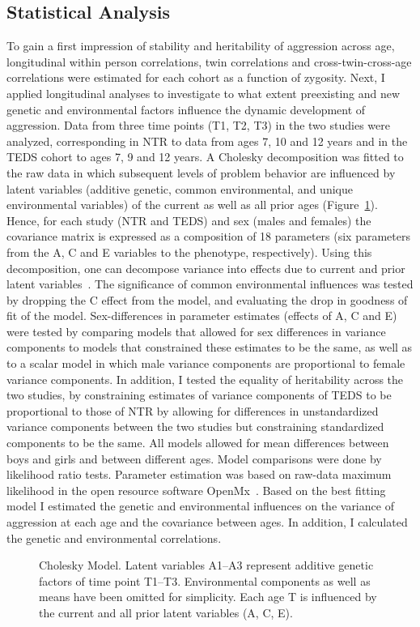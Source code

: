 \subsection{Statistical Analysis}
To gain a first impression of stability and heritability of aggression across age, longitudinal within person correlations, twin correlations and cross-twin-cross-age correlations were estimated for each cohort as a function of zygosity.
Next, I applied longitudinal analyses to investigate to what extent preexisting and new genetic and environmental factors influence the dynamic development of aggression.
Data from three time points (T1, T2, T3) in the two studies were analyzed, corresponding in NTR to data from ages 7, 10 and 12 years and in the TEDS cohort to ages 7, 9 and 12 years.
A Cholesky decomposition was fitted to the raw data in which subsequent levels of problem behavior are influenced by latent variables (additive genetic, common environmental, and unique environmental variables) of the current as well as all prior ages (Figure~\ref{fig:cholesky}).
Hence, for each study (NTR and TEDS) and sex (males and females) the covariance matrix is expressed as a composition of 18 parameters (six parameters from the A, C and E variables to the phenotype, respectively).
Using this decomposition, one can decompose variance into effects due to current and prior latent variables~\cite{Franic2014}.
The significance of common environmental influences was tested by dropping the C effect from the model, and evaluating the drop in goodness of fit of the model.
Sex-differences in parameter estimates (effects of A, C and E) were tested by comparing models that allowed for sex differences in variance components to models that constrained these estimates to be the same, as well as to a scalar model in which male variance components are proportional to female variance components.
In addition, I tested the equality of heritability across the two studies, by constraining estimates of variance components of TEDS to be proportional to those of NTR by allowing for differences in unstandardized variance components between the two studies but constraining standardized components to be the same.
All models allowed for mean differences between boys and girls and between different ages.
Model comparisons were done by likelihood ratio tests.
Parameter estimation was based on raw-data maximum likelihood in the open resource software OpenMx~\cite{Boker2011}.
Based on the best fitting model I estimated the genetic and environmental influences on the variance of aggression at each age and the covariance between ages.
In addition, I calculated the genetic and environmental correlations.

\begin{figure}[htpb]
  \centering
  \scalebox{0.6}{}
  \caption[Cholesky Model]{Cholesky Model. Latent variables A1--A3 represent additive genetic factors of time point T1--T3.
  Environmental components as well as means have been omitted for simplicity.
Each age T is influenced by the current and all prior latent variables (A, C, E).}\label{fig:cholesky}
\end{figure}
